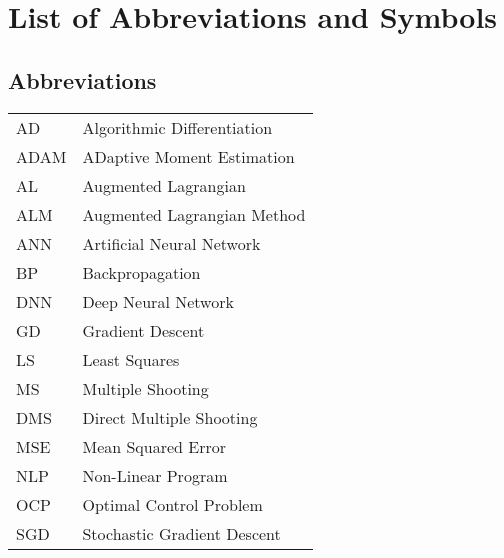 \documentclass[master=wit,english]{kulemt}
\begin{document}

\listoffiguresandtables
\chapter{List of Abbreviations and Symbols}
\section*{Abbreviations}
\begin{flushleft}
  \renewcommand{\arraystretch}{1.1}
  \begin{tabularx}{\textwidth}{@{}p{12mm}X@{}}
  	AD & Algorithmic Differentiation \\
  	ADAM & ADaptive Moment Estimation \\
  	AL & Augmented Lagrangian \\
  	ALM & Augmented Lagrangian Method \\
  	ANN & Artificial Neural Network \\
  	BP & Backpropagation \\
  	DNN & Deep Neural Network \\
  	GD & Gradient Descent \\
  	LS & Least Squares \\
  	MS & Multiple Shooting \\
  	DMS & Direct Multiple Shooting \\
  	MSE & Mean Squared Error \\
  	NLP & Non-Linear Program \\
  	OCP & Optimal Control Problem \\
  	SGD & Stochastic Gradient Descent \\ 
  \end{tabularx}
\end{flushleft}
\end{document}
